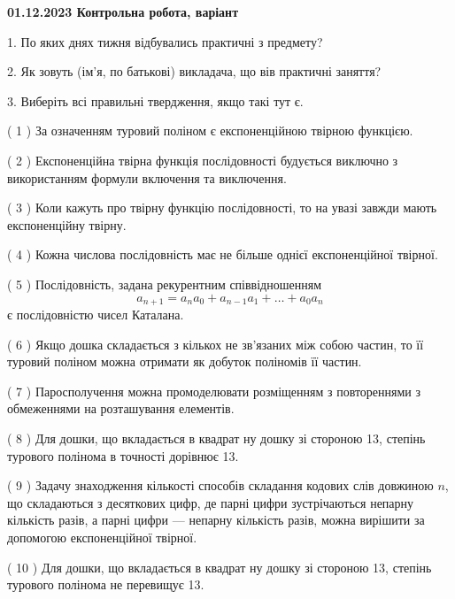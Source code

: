 \documentclass[12pt, ukrainian]{article}
\begin{document}
\vspace{4mm}
\newpage
\begin {large}

\textbf{01.12.2023 Контрольна робота, варіант  }\par


{
1. По яких днях тижня відбувались практичні з предмету?



\vspace{5mm}
2. Як зовуть (ім'я, по батькові) викладача, що вів практичні заняття?



\vspace{5mm}
3. Виберіть всі правильні твердження, якщо такі тут є.\par
\vspace{2mm}
( 1 ) За означенням туровий поліном є експоненційною твірною функцією.%

( 2 ) Експоненційна твірна функція послідовності будується виключно з використанням формули включення та виключення.%

( 3 ) Коли кажуть про твірну функцію послідовності, то на увазі завжди мають експоненційну твірну.%

( 4 ) Кожна числова послідовність має не більше однієї  експоненційної твірної.%

( 5 ) Послідовність, задана рекурентним співвідношенням $$a_{n+1}=a_{n}a_{0}+a_{n-1}a_{1}+\ldots+a_0a_{n}$$ є послідовністю чисел Каталана.%

( 6 ) Якщо дошка складається з кількох не зв’язаних між собою частин, то її туровий поліном можна отримати як добуток поліномів її частин.%

( 7 ) Паросполучення можна промоделювати розміщенням з повтореннями з обмеженнями на розташування елементів.%

( 8 ) Для дошки, що вкладається в квадрат ну дошку зі стороною 13, степінь турового полінома в точності дорівнює 13.%

( 9 ) Задачу знаходження кількості способів складання кодових слів довжиною $n$, що складаються з десяткових цифр, де парні цифри зустрічаються непарну кількість разів, а парні цифри — непарну кількість разів, можна вирішити за допомогою експоненційної твірної.%

( 10 ) Для дошки, що вкладається в квадрат ну дошку зі стороною 13, степінь турового полінома не перевищує 13.%
}
\end {large}
\end{document}
